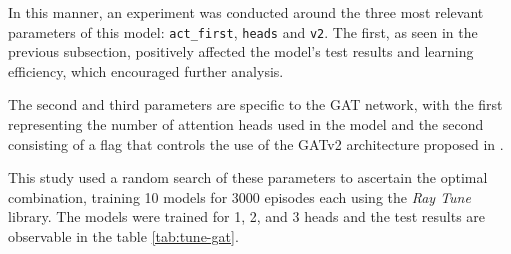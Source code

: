 In this manner, an experiment was conducted around the three most relevant parameters of this model: \texttt{act\_first}, \texttt{heads} and \texttt{v2}. The first, as seen in the previous subsection, positively affected the model's test results and learning efficiency, which encouraged further analysis. \par

The second and third parameters are specific to the \ac{GAT} network, with the first representing the number of attention heads used in the model and the second consisting of a flag that controls the use of the GATv2 architecture proposed in \cite{brodyHowAttentiveAre2022}. \par

This study used a random search of these parameters to ascertain the optimal combination, training 10 models for 3000 episodes each using the \textit{Ray Tune} library. The models were trained for 1, 2, and 3 heads and the test results are observable in the table \ref{tab:tune-gat}. \par


